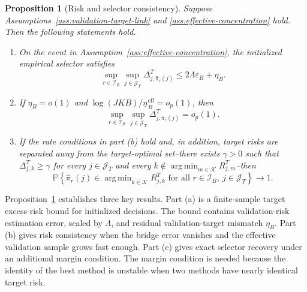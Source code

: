 \documentclass[a4paper, 12pt]{article}
\theoremstyle{plain}
\newtheorem{proposition}{Proposition}
\theoremstyle{remark}
\DeclareMathOperator*{\argmin}{arg\,min}
\newcommand{\Prb}{\mathbb{P}}
\newcommand{\Kcal}{\mathcal{K}}
\newcommand{\1}{\mathbf{1}}
\begin{document}
\begin{proposition}[Risk and selector consistency]
\label{prop:risk-consistency}
Suppose Assumptions~\ref{ass:validation-target-link} and \ref{ass:effective-concentration} hold. Then the following statements hold.
\begin{enumerate}[label=(\alph*), leftmargin=*]
    \item On the event in Assumption~\ref{ass:effective-concentration}, the initialized empirical selector satisfies
    \begin{equation}
    \label{eq:selector-risk-bound}
        \sup_{r\in\mathcal I_B}
        \sup_{j\in\mathcal J_T}
        \Delta^T_{j,\widehat\pi_r(j)}
        \leq
        2\Lambda\varepsilon_B+\eta_B .
    \end{equation}
    \item If \(\eta_B=o(1)\) and \(\log(JKB)/\underline n^{\mathrm{eff}}_B=o_p(1)\), then
    \begin{equation}
    \label{eq:selector-risk-consistency}
        \sup_{r\in\mathcal I_B}
        \sup_{j\in\mathcal J_T}
        \Delta^T_{j,\widehat\pi_r(j)}
        =o_p(1) .
    \end{equation}
    \item If the rate conditions in part (b) hold and, in addition, target risks are separated away from the target-optimal set--there exists \(\gamma>0\) such that \(\Delta^T_{j,k}\geq\gamma\) for every \(j\in\mathcal J_T\) and every \(k\notin\argmin_{m\in\Kcal}R^T_{j,m}\)--then
    \begin{equation}
    \label{eq:selector-exact-recovery}
        \Prb\!\left\{
        \widehat\pi_r(j)\in\argmin_{k\in\Kcal}R^T_{j,k}
        \text{ for all } r\in\mathcal I_B,\ j\in\mathcal J_T
        \right\}
        \to1 .
    \end{equation}
\end{enumerate}
\end{proposition}

Proposition~\ref{prop:risk-consistency} establishes three key results. Part (a) is a finite-sample target excess-risk bound for initialized decisions. The bound contains validation-risk estimation error, scaled by \(\Lambda\), and residual validation-target mismatch \(\eta_B\). Part (b) gives risk consistency when the bridge error vanishes and the effective validation sample grows fast enough. Part (c) gives exact selector recovery under an additional margin condition. The margin condition is needed because the identity of the best method is unstable when two methods have nearly identical target risk.
\end{document}
